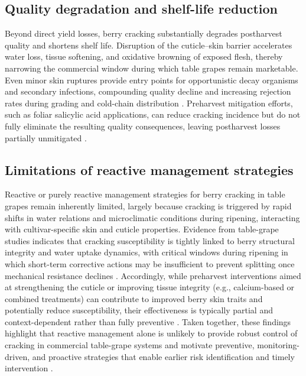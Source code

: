 \subsection{Quality degradation and shelf-life reduction}

\noindent
Beyond direct yield losses, berry cracking substantially degrades postharvest quality and shortens shelf life. Disruption of the cuticle--skin barrier accelerates water loss, tissue softening, and oxidative browning of exposed flesh, thereby narrowing the commercial window during which table grapes remain marketable. Even minor skin ruptures provide entry points for opportunistic decay organisms and secondary infections, compounding quality decline and increasing rejection rates during grading and cold-chain distribution \parencite{agronomy12102437,xu2025overview}. Preharvest mitigation efforts, such as foliar salicylic acid applications, can reduce cracking incidence but do not fully eliminate the resulting quality consequences, leaving postharvest losses partially unmitigated \parencite{app112311374}.


\subsection{Limitations of reactive management strategies}

\noindent
Reactive or purely reactive management strategies for berry cracking in table grapes remain inherently limited, largely because cracking is triggered by rapid shifts in water relations and microclimatic conditions during ripening, interacting with cultivar-specific skin and cuticle properties. Evidence from table-grape studies indicates that cracking susceptibility is tightly linked to berry structural integrity and water uptake dynamics, with critical windows during ripening in which short-term corrective actions may be insufficient to prevent splitting once mechanical resistance declines \parencite{Chang2019,Chang2021,YU20251506}. Accordingly, while preharvest interventions aimed at strengthening the cuticle or improving tissue integrity (e.g., calcium-based or combined treatments) can contribute to improved berry skin traits and potentially reduce susceptibility, their effectiveness is typically partial and context-dependent rather than fully preventive \parencite{plants13172400}. Taken together, these findings highlight that reactive management alone is unlikely to provide robust control of cracking in commercial table-grape systems and motivate preventive, monitoring-driven, and proactive strategies that enable earlier risk identification and timely intervention \parencite{CrackSense2022}.




